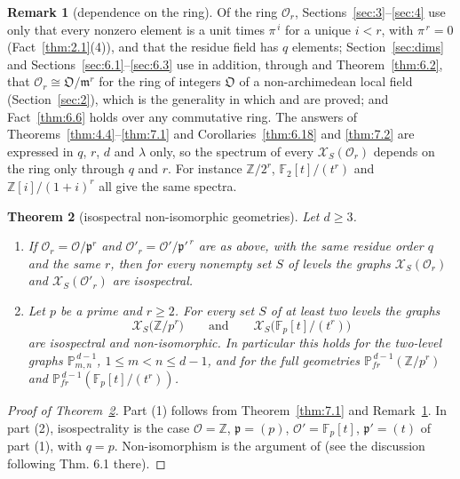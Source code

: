\documentclass[11pt]{article}
\numberwithin{equation}{section}
\theoremstyle{plain}
\newtheorem{theorem}{Theorem}[section]
\theoremstyle{definition}
\newtheorem{remark}[theorem]{Remark}
\begin{document}
\begin{remark}[dependence on the ring]\label{thm:7.5}
Of the ring $\mathcal{O}_r$, Sections~\ref{sec:3}--\ref{sec:4}
use only that every nonzero element is a unit times $\pi^{\,i}$ for a unique
$i<r$, with $\pi^{\,r}=0$ (Fact~\ref{thm:2.1}(4)), and that the residue field has $q$
elements; Section~\ref{sec:dims} and Sections~\ref{sec:6.1}--\ref{sec:6.3} use in addition,
through \cite{OS06} and Theorem~\ref{thm:6.2}, that $\mathcal{O}_r\cong\mathfrak{O}/\mathfrak{m}^r$ for the ring of integers
$\mathfrak{O}$ of a non-archimedean local field (Section~\ref{sec:2}), which is the generality
in which \cite{BO12} and \cite{OS06} are proved; and Fact~\ref{thm:6.6} holds over any commutative ring.
The answers of Theorems~\ref{thm:4.4}--\ref{thm:7.1} and Corollaries~\ref{thm:6.18} and \ref{thm:7.2} are expressed in $q$,
$r$, $d$ and $\lambda$ only, so the spectrum of every $\mathcal{X}_S(\mathcal{O}_r)$
depends on the ring only through $q$ and $r$. For instance $\mathbb{Z}/2^r$,
$\mathbb{F}_2[t]/(t^r)$ and $\mathbb{Z}[i]/(1+i)^r$ all give the same spectra.
\end{remark}

\begin{theorem}[isospectral non-isomorphic geometries]\label{thm:7.6}
Let $d\ge3$.
\begin{enumerate}
\item If $\mathcal{O}_r=\mathcal{O}/\mathfrak{p}^r$ and
  $\mathcal{O}'_r=\mathcal{O}'/\mathfrak{p}'^{\,r}$ are as above, with the same
  residue order $q$ and the same $r$, then for every nonempty set $S$ of levels the
  graphs $\mathcal{X}_S(\mathcal{O}_r)$ and $\mathcal{X}_S(\mathcal{O}'_r)$ are
  isospectral.
\item Let $p$ be a prime and $r\ge2$. For every set $S$ of at least two levels the graphs
  \[
  \mathcal{X}_S\bigl(\mathbb{Z}/p^r\bigr)\qquad\text{and}\qquad
  \mathcal{X}_S\bigl(\mathbb{F}_p[t]/(t^r)\bigr)
  \]
  are isospectral and non-isomorphic. In particular this holds for the two-level graphs
  $\mathbb{P}^{\,d-1}_{m,n}$, $1\le m<n\le d-1$, and for the full geometries
  $\mathbb{P}^{\,d-1}_{fr}(\mathbb{Z}/p^r)$ and $\mathbb{P}^{\,d-1}_{fr}(\mathbb{F}_p[t]/(t^r))$.
\end{enumerate}
\end{theorem}

\begin{proof}[Proof of Theorem~\ref{thm:7.6}]
Part (1) follows from Theorem~\ref{thm:7.1} and Remark~\ref{thm:7.5}. In part
(2), isospectrality is the case $\mathcal{O}=\mathbb{Z}$, $\mathfrak{p}=(p)$,
$\mathcal{O}'=\mathbb{F}_p[t]$, $\mathfrak{p}'=(t)$ of part (1), with $q=p$.
Non-isomorphism is the argument of \cite[\S6]{LP25} (see the discussion following Thm. 6.1
there).
\end{proof}
\end{document}
